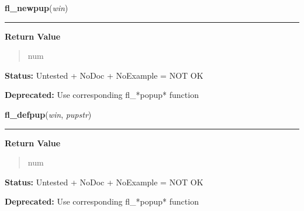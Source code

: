     \label{xformslib:deprecated:fl_newpup}

    \vspace{0.5ex}

\hspace{.8\funcindent}\begin{boxedminipage}{\funcwidth}

    \raggedright \textbf{fl\_newpup}(\textit{win})

    \vspace{-1.5ex}

    \rule{\textwidth}{0.5\fboxrule}
\setlength{\parskip}{2ex}
\setlength{\parskip}{1ex}
      \textbf{Return Value}
    \vspace{-1ex}

      \begin{quote}
      num

      \end{quote}

\textbf{Status:} Untested + NoDoc + NoExample = NOT OK



\textbf{Deprecated:} Use corresponding fl\_*popup* function



    \end{boxedminipage}

    \label{xformslib:deprecated:fl_defpup}

    \vspace{0.5ex}

\hspace{.8\funcindent}\begin{boxedminipage}{\funcwidth}

    \raggedright \textbf{fl\_defpup}(\textit{win}, \textit{pupstr})

    \vspace{-1.5ex}

    \rule{\textwidth}{0.5\fboxrule}
\setlength{\parskip}{2ex}
\setlength{\parskip}{1ex}
      \textbf{Return Value}
    \vspace{-1ex}

      \begin{quote}
      num

      \end{quote}

\textbf{Status:} Untested + NoDoc + NoExample = NOT OK



\textbf{Deprecated:} Use corresponding fl\_*popup* function



    \end{boxedminipage}

